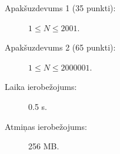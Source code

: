 \documentclass{boi2014-lv}
\begin{document}
    \Scoring

    \begin{description}
        \item[Apakšuzdevums 1 (35 punkti):] $1 \le N \le 2001$.
        \item[Apakšuzdevums 2 (65 punkti):] $1 \le N \le 2000001$.
    \end{description}

    \Constraints

    \begin{description}
        \item[Laika ierobežojums:] 0.5 s.
        \item[Atmiņas ierobežojums:] 256 MB.
    \end{description}
\end{document}
